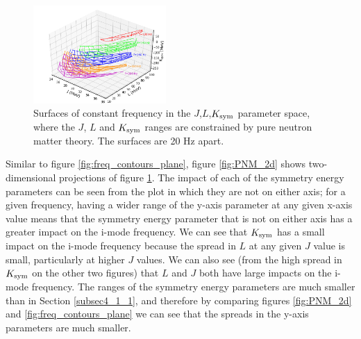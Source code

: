 \documentclass[fleqn,usenatbib]{mnras}
\begin{document}
\begin{figure}
\centering
\includegraphics[width=0.45\textwidth,angle=0]{PNM_planes}
\caption{Surfaces of constant frequency in the $J$,$L$,$K_{\rm sym}$ parameter space, where the $J$, $L$ and $K_{\rm sym}$ ranges are constrained by pure neutron matter theory. The surfaces are 20 Hz apart.}
\label{fig:PNM_planes}
\end{figure}

Similar to figure \ref{fig:freq_contours_plane}, figure \ref{fig:PNM_2d} shows two-dimensional projections of figure \ref{fig:PNM_planes}. The impact of each of the symmetry energy parameters can be seen from the plot in which they are not on either axis; for a given frequency, having a wider range of the y-axis parameter at any given x-axis value means that the symmetry energy parameter that is not on either axis has a greater impact on the i-mode frequency. We can see that $K_{\rm sym}$ has a small impact on the i-mode frequency because the spread in $L$ at any given $J$ value is small, particularly at higher $J$ values. We can also see (from the high spread in $K_{\rm sym}$ on the other two figures) that $L$ and $J$ both have large impacts on the i-mode frequency. The ranges of the symmetry energy parameters are much smaller than in Section \ref{subsec4_1_1}, and therefore by comparing figures \ref{fig:PNM_2d} and \ref{fig:freq_contours_plane} we can see that the spreads in the y-axis parameters are much  smaller.
\end{document}
